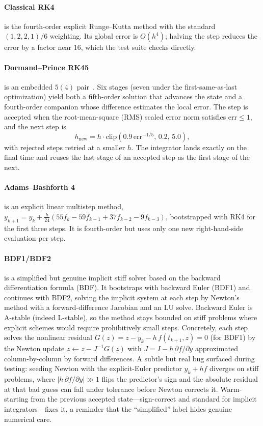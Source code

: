 \documentclass[sigplan,nonacm,screen,review]{acmart}
\begin{document}
\paragraph{Classical RK4} is the fourth-order explicit Runge--Kutta method with
the standard $(1,2,2,1)/6$ weighting. Its global error is $O(h^4)$; halving the
step reduces the error by a factor near $16$, which the test suite checks
directly.

\paragraph{Dormand--Prince RK45} is an embedded $5(4)$ pair~\cite{dormandprince1980}.
Six stages (seven under the first-same-as-last optimization) yield both a
fifth-order solution that advances the state and a fourth-order companion whose
difference estimates the local error. The step is accepted when the
root-mean-square (RMS) scaled
error norm satisfies $\mathrm{err} \le 1$, and the next step is
\[
  h_{\text{new}} = h \cdot \mathrm{clip}\!\left(0.9\,\mathrm{err}^{-1/5},\,0.2,\,5.0\right),
\]
with rejected steps retried at a smaller $h$. The integrator lands exactly on the
final time and reuses the last stage of an accepted step as the first stage of
the next.

\paragraph{Adams--Bashforth 4} is an explicit linear multistep method,
$y_{k+1} = y_k + \tfrac{h}{24}(55 f_k - 59 f_{k-1} + 37 f_{k-2} - 9 f_{k-3})$,
bootstrapped with RK4 for the first three steps. It is fourth-order but uses only
one new right-hand-side evaluation per step.

\paragraph{BDF1/BDF2} is a simplified but genuine implicit stiff solver based on
the backward differentiation formula (BDF). It
bootstraps with backward Euler (BDF1) and continues with BDF2, solving the
implicit system at each step by Newton's method with a forward-difference
Jacobian and an LU solve. Backward Euler is A-stable (indeed L-stable), so the
method stays bounded on stiff problems where explicit schemes would require
prohibitively small steps. Concretely, each step solves the nonlinear residual
$G(z) = z - y_k - h\,f(t_{k+1}, z) = 0$ (for BDF1) by the Newton update
$z \leftarrow z - J^{-1}G(z)$ with $J = I - h\,\partial f/\partial y$ approximated
column-by-column by forward differences. A subtle but real bug surfaced during
testing: seeding Newton with the explicit-Euler predictor $y_k + h f$ diverges on
stiff problems, where $|h\,\partial f/\partial y| \gg 1$ flips the predictor's
sign and the absolute residual at that bad guess can fall under tolerance before
Newton corrects it. Warm-starting from the previous accepted state---sign-correct
and standard for implicit integrators---fixes it, a reminder that the
``simplified'' label hides genuine numerical care.
\end{document}
